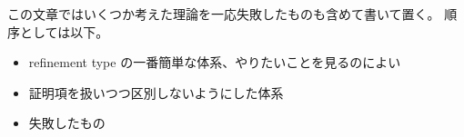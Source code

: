 この文章ではいくつか考えた理論を一応失敗したものも含めて書いて置く。
順序としては以下。
\begin{itemize}
  \item refinement type の一番簡単な体系、やりたいことを見るのによい
  \item 証明項を扱いつつ区別しないようにした体系
  \item 失敗したもの
\end{itemize}